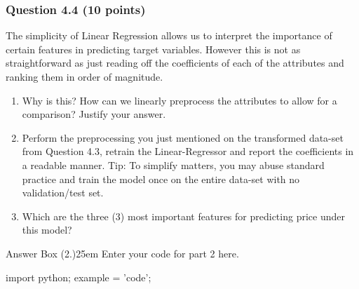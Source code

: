 \documentclass[12pt]{article}
\begin{document}




\subsubsection*{Question 4.4 (10 points)}
The simplicity of Linear Regression allows us to interpret the importance of certain features in predicting target variables. However this is not as straightforward as just reading off the coefficients of each of the attributes and ranking them in order of magnitude.

\begin{enumerate}
    \item[1] [Text] Why is this? How can we linearly preprocess the attributes to allow for a comparison? Justify your answer.
    \item[2] [Code] Perform the preprocessing you just mentioned on the transformed data-set from Question 4.3, retrain the Linear-Regressor and report the coefficients in a readable manner. Tip: To simplify matters, you may abuse standard practice and train the model once on the entire data-set with no validation/test set.
    \item[3] [Text] Which are the three (3) most important features for predicting price under this model?
\end{enumerate}



\begin{code}{Answer Box (2.)}{25em}
    Enter your code for part 2 here.

    import python;
    example = 'code';
\end{code}




\end{document}
